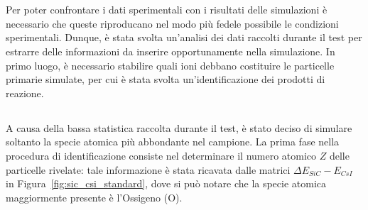 \section{}

Per poter confrontare i dati sperimentali con i risultati delle simulazioni è necessario che queste riproducano nel modo più fedele possibile le condizioni sperimentali.
Dunque, è stata svolta un'analisi dei dati raccolti durante il test per estrarre delle informazioni da inserire opportunamente nella simulazione.
In primo luogo, è necessario stabilire quali ioni debbano costituire le particelle primarie simulate, per cui è stata svolta un'identificazione dei prodotti di reazione.



\subsection{}

A causa della bassa statistica raccolta durante il test, è stato deciso di simulare soltanto la specie atomica più abbondante nel campione.
La prima fase nella procedura di identificazione consiste nel determinare il numero atomico $Z$ delle particelle rivelate: tale informazione è stata ricavata dalle matrici $\Delta E_{SiC} - E_{CsI}$ in Figura~\ref{fig:sic_csi_standard}, dove si può notare che la specie atomica maggiormente presente è l'Ossigeno (O). 

